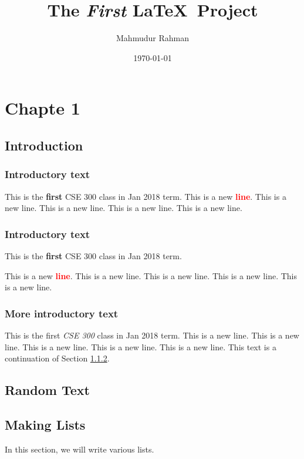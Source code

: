 \documentclass{book}
\title{The \textit{First} \LaTeX ~\textbf{Project}}
\author{Mahmudur Rahman}
\date{\today}
\begin{document}
\maketitle

\newpage

\tableofcontents

\newpage

\chapter{Chapte 1}

\section{Introduction}

\subsection{Introductory text}
This is the \textbf{first} CSE 300 class in Jan 2018 term.
This is a new \textcolor{red}{\textbf{line}}.
This is a new line.
This is a new line.
This is a new line.
This is a new line.


\subsection{Introductory text}
\label{sec:intro_text}
This is the \textbf{first} CSE 300 class in Jan 2018 term.

This is a new \textcolor{red}{\textbf{line}}.
This is a new line.
This is a new line.
This is a new line.
This is a new line.

\subsection{More introductory text}
This is the first \textit{CSE 300} class in Jan 2018 term.
This is a new line.
This is a new line.
This is a new line.
This is a new line.
This is a new line. This text is a continuation of Section \ref{sec:intro_text}.

\section{Random Text}

\lipsum

\section{Making Lists}
In this section, we will write various lists.
\end{document}
